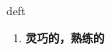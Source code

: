 
\begin{frame}
{\huge deft}
\begin{center}
\begin{enumerate}\Large
  \item \textbf{灵巧的，熟练的}
\end{enumerate}
\end{center}
\end{frame}
